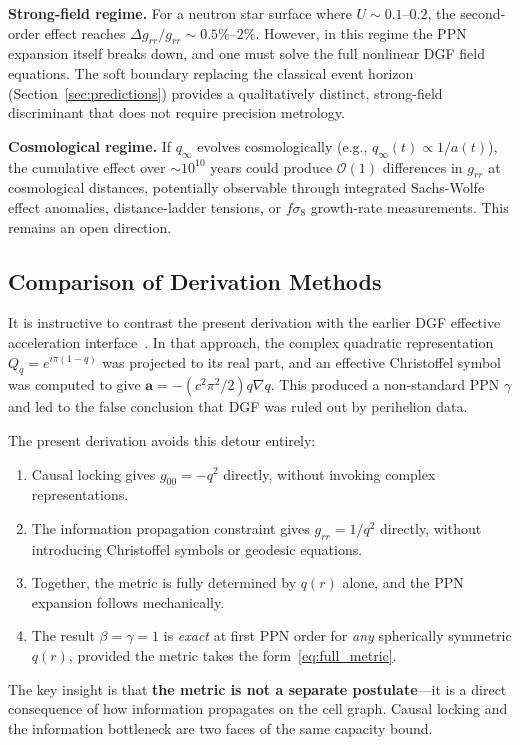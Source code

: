 \textbf{Strong-field regime.}
For a neutron star surface where $U\sim 0.1$--$0.2$, the second-order effect reaches $\Delta g_{rr}/g_{rr}\sim 0.5\%$--$2\%$.
However, in this regime the PPN expansion itself breaks down, and one must solve the full nonlinear DGF field equations.
The soft boundary replacing the classical event horizon (Section~\ref{sec:predictions}) provides a qualitatively distinct, strong-field discriminant that does not require precision metrology.

\textbf{Cosmological regime.}
If $q_\infty$ evolves cosmologically (e.g., $q_\infty(t)\propto 1/a(t)$), the cumulative effect over $\sim 10^{10}$ years could produce $\mathcal{O}(1)$ differences in $g_{rr}$ at cosmological distances, potentially observable through integrated Sachs-Wolfe effect anomalies, distance-ladder tensions, or $f\sigma_8$ growth-rate measurements.
This remains an open direction.

\subsection{Comparison of Derivation Methods}

It is instructive to contrast the present derivation with the earlier DGF effective acceleration interface~\cite{DGF_v3_1}.
In that approach, the complex quadratic representation $Q_q=e^{i\pi(1-q)}$ was projected to its real part, and an effective Christoffel symbol was computed to give $\mathbf{a}=-(c^2\pi^2/2)q\nabla q$.
This produced a non-standard PPN $\gamma$ and led to the false conclusion that DGF was ruled out by perihelion data.

The present derivation avoids this detour entirely:
\begin{enumerate}
    \item Causal locking gives $g_{00}=-q^2$ directly, without invoking complex representations.
    \item The information propagation constraint gives $g_{rr}=1/q^2$ directly, without introducing Christoffel symbols or geodesic equations.
    \item Together, the metric is fully determined by $q(r)$ alone, and the PPN expansion follows mechanically.
    \item The result $\beta=\gamma=1$ is \emph{exact} at first PPN order for \emph{any} spherically symmetric $q(r)$, provided the metric takes the form~\eqref{eq:full_metric}.
\end{enumerate}

The key insight is that \textbf{the metric is not a separate postulate}---it is a direct consequence of how information propagates on the cell graph.
Causal locking and the information bottleneck are two faces of the same capacity bound.

